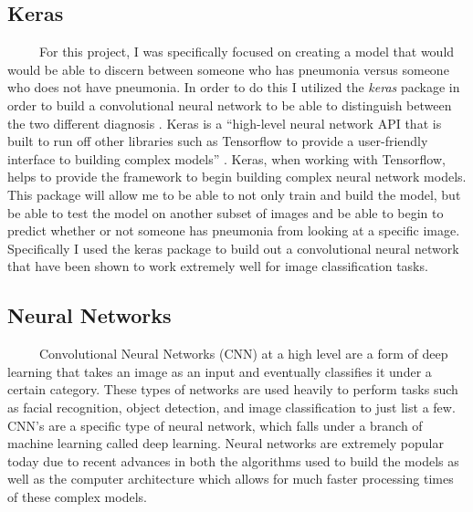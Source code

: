 \documentclass[12pt]{article}
\begin{document}
\hypertarget{keras}{%
\subsection{Keras}\label{keras}}

~~~~~For this project, I was specifically focused on creating a model
that would would be able to discern between someone who has pneumonia
versus someone who does not have pneumonia. In order to do this I
utilized the \emph{keras} package in order to build a convolutional
neural network to be able to distinguish between the two different
diagnosis \citet{Keras2}. Keras is a ``high-level neural network API
that is built to run off other libraries such as Tensorflow to provide a
user-friendly interface to building complex models'' \citet{PML}. Keras,
when working with Tensorflow, helps to provide the framework to begin
building complex neural network models. This package will allow me to be
able to not only train and build the model, but be able to test the
model on another subset of images and be able to begin to predict
whether or not someone has pneumonia from looking at a specific image.
Specifically I used the keras package to build out a convolutional
neural network that have been shown to work extremely well for image
classification tasks.

\hypertarget{neural-networks}{%
\subsection{Neural Networks}\label{neural-networks}}

~~~~~Convolutional Neural Networks (CNN) at a high level are a form of
deep learning that takes an image as an input and eventually classifies
it under a certain category. These types of networks are used heavily to
perform tasks such as facial recognition, object detection, and image
classification to just list a few. CNN's are a specific type of neural
network, which falls under a branch of machine learning called deep
learning. Neural networks are extremely popular today due to recent
advances in both the algorithms used to build the models as well as the
computer architecture which allows for much faster processing times of
these complex models.
\end{document}
